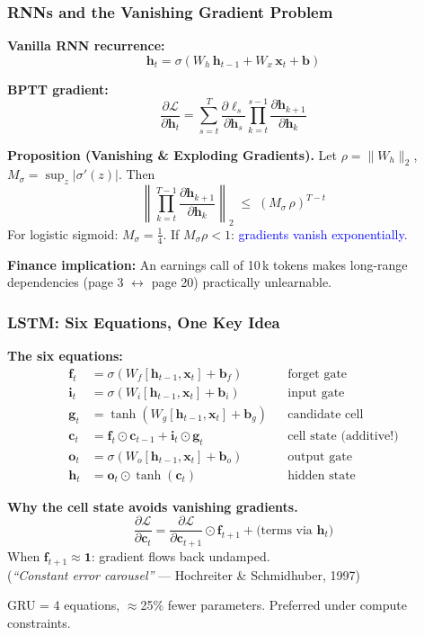 \documentclass[9pt,t]{beamer}
\begin{document}
\begin{frame}
\frametitle{RNNs and the Vanishing Gradient Problem}

\textbf{Vanilla RNN recurrence:}
\[
\mathbf{h}_t = \sigma\!\left(W_h\,\mathbf{h}_{t-1} + W_x\,\mathbf{x}_t + \mathbf{b}\right)
\]

\textbf{BPTT gradient:}
\[
\frac{\partial \mathcal{L}}{\partial \mathbf{h}_t}
= \sum_{s=t}^{T} \frac{\partial \ell_s}{\partial \mathbf{h}_s}
  \prod_{k=t}^{s-1} \frac{\partial \mathbf{h}_{k+1}}{\partial \mathbf{h}_k}
\]

\begin{underhood}
{\small
\textbf{Proposition (Vanishing \& Exploding Gradients).}
Let $\rho = \|W_h\|_2$, $M_\sigma = \sup_z |\sigma'(z)|$. Then
\[
\left\|\prod_{k=t}^{T-1}\frac{\partial \mathbf{h}_{k+1}}{\partial \mathbf{h}_k}\right\|_2
\;\leq\; \left(M_\sigma\,\rho\right)^{T-t}
\]
For logistic sigmoid: $M_\sigma = \tfrac{1}{4}$.
If $M_\sigma\rho < 1$: \textcolor{blue}{gradients vanish exponentially.}
}
\end{underhood}

\textbf{Finance implication:} An earnings call of 10\,k tokens makes long-range
dependencies (page 3 $\leftrightarrow$ page 20) practically unlearnable.
\end{frame}

\begin{frame}
\frametitle{LSTM: Six Equations, One Key Idea}

\textbf{The six equations:}
{\small
\begin{align*}
\mathbf{f}_t &= \sigma(W_f[\mathbf{h}_{t-1},\mathbf{x}_t] + \mathbf{b}_f)
  &&\text{forget gate}\\
\mathbf{i}_t &= \sigma(W_i[\mathbf{h}_{t-1},\mathbf{x}_t] + \mathbf{b}_i)
  &&\text{input gate}\\
\mathbf{g}_t &= \tanh(W_g[\mathbf{h}_{t-1},\mathbf{x}_t] + \mathbf{b}_g)
  &&\text{candidate cell}\\
\mathbf{c}_t &= \mathbf{f}_t \odot \mathbf{c}_{t-1} + \mathbf{i}_t \odot \mathbf{g}_t
  &&\text{cell state (additive!)}\\
\mathbf{o}_t &= \sigma(W_o[\mathbf{h}_{t-1},\mathbf{x}_t] + \mathbf{b}_o)
  &&\text{output gate}\\
\mathbf{h}_t &= \mathbf{o}_t \odot \tanh(\mathbf{c}_t)
  &&\text{hidden state}
\end{align*}
}

\begin{underhood}
\textbf{Why the cell state avoids vanishing gradients.}
\[
\frac{\partial \mathcal{L}}{\partial \mathbf{c}_t}
= \frac{\partial \mathcal{L}}{\partial \mathbf{c}_{t+1}} \odot \mathbf{f}_{t+1}
  + \text{(terms via } \mathbf{h}_t\text{)}
\]
When $\mathbf{f}_{t+1} \approx \mathbf{1}$: gradient flows back undamped.\\
(\emph{``Constant error carousel''} — Hochreiter \& Schmidhuber, 1997)
\end{underhood}

GRU = 4 equations, $\approx$25\% fewer parameters. Preferred under compute constraints.
\end{frame}
\end{document}

